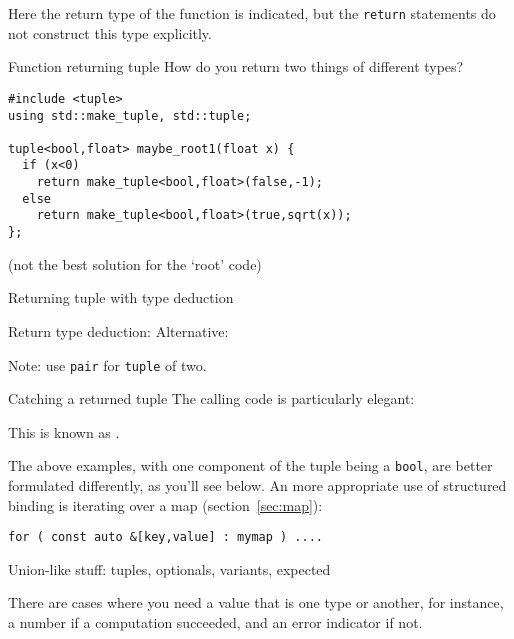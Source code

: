 Here the return type of the function is indicated,
but the \lstinline{return} statements do not
construct this type explicitly.

\begin{slide}{Function returning tuple}
  \label{sl:tupleexplicit}
  How do you return two things of different types?
  \lstset{numbers=left,numberstyle=\tiny}
\begin{lstlisting}
#include <tuple>
using std::make_tuple, std::tuple;

tuple<bool,float> maybe_root1(float x) {
  if (x<0)
    return make_tuple<bool,float>(false,-1);
  else
    return make_tuple<bool,float>(true,sqrt(x));
};
  \end{lstlisting}
(not the best solution for the `root' code) 
\end{slide}

\begin{slide}{Returning tuple with type deduction}
  \label{sl:tuplefun}
  \lstset{numbers=left,numberstyle=\tiny}
  \begin{multicols}{2}
    Return type deduction:
    \columnbreak
    Alternative:
  \end{multicols}
  Note: use \lstinline{pair} for \lstinline{tuple} of two.
\end{slide}

\begin{block}{Catching a returned tuple}
  \label{sl:catch-tuple}
  The calling code is particularly elegant:

  This is known as .
\end{block}

The above examples,
with one component of the tuple being a \lstinline{bool},
are better formulated differently, as you'll see below.
An more appropriate use of structured binding is iterating over a map (section~\ref{sec:map}):
\begin{lstlisting}
for ( const auto &[key,value] : mymap ) ....
\end{lstlisting}

 {Union-like stuff: tuples, optionals, variants, expected}


There are cases where you need a value that is one type or another,
for instance, a number if a computation succeeded, and an error
indicator if not.

